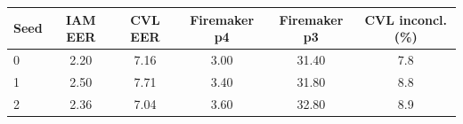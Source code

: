 \begin{tabular}{lccccc}
\toprule
Seed & IAM EER & CVL EER & Firemaker p4 & Firemaker p3 & CVL inconcl. (\%) \\
\midrule
0 & 2.20 & 7.16 & 3.00 & 31.40 & 7.8 \\
1 & 2.50 & 7.71 & 3.40 & 31.80 & 8.8 \\
2 & 2.36 & 7.04 & 3.60 & 32.80 & 8.9 \\
\bottomrule
\end{tabular}
